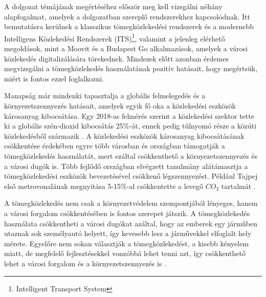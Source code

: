 A dolgozat témájának megértéséhez először meg kell vizsgálni néhány alapfogalmat, amelyek a dolgozatban szereplő rendszerekhez kapcsolódnak. Itt bemutatásra kerülnek a klasszikus tömegközlekedési rendszerek és a modernebb Intelligens Közlekedési Rendszerek (ITS)\footnote{Intelligent Transport System}, valamint a jelenleg elérhető megoldások, mint a Moovit és a Budapest Go alkalmazások, amelyek a városi közlekedés digitalizálására törekednek. Mindezek előtt azonban érdemes megvizsgálni a tömegközlekedés használatának pozitív hatásait, hogy megértsük, miért is fontos ezzel foglalkozni.

Manapság már mindenki tapasztalja a globális felmelegedés és a környezetszennyezés hatásait, amelyek egyik fő oka a közlekedési eszközök károsanyag kibocsátása. Egy 2018-as felmérés szerint a közlekedési szektor tette ki a globális szén-dioxid kibocsátás 25\%-át, ennek pedig túlnyomó része a közúti közlekedésből származik \cite{cropper2024measuring}. A közlekedési eszközök károsanyag kibocsátásának csökkentése érdekében egyre több városban és országban támogatják a tömegközlekedés használatát, mert ezáltal csökkenthető a környezetszennyezés és a városi dugók is. Több fejlődő országban elvégzett tanulmány alátámasztja a tömegközlekedési eszközök bevezetésével csökkenő légszennyezést. Például Tajpej első metrovonalának megnyitása 5-15\%-al csökkentette a levegő $CO_2$ tartalmát \cite{cropper2024measuring}.

A tömegközlekedés nem csak a környezetvédelem szempontjából lényeges, hanem a városi forgalom csökkentésében is fontos szerepet játszik. A tömegközlekedés használata csökkentheti a városi dugókat azáltal, hogy az emberek egy járműben utaznak sok személyautó helyett, így kevesebb lesz a járművekkel elfoglalt hely mérete. Egyelőre nem sokan választják a tömegközlekedést, a kisebb kényelem miatt, de megfelelő fejlesztésekkel vonzóbbá lehet tenni azt, így csökkenthető lehet a városi forgalom és a környezetszennyezés is \cite{le2016encouraging}.

